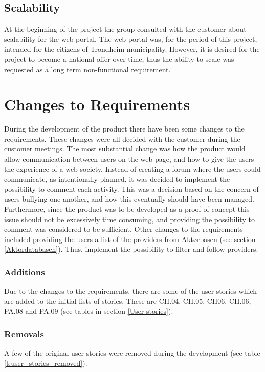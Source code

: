 \subsection{Scalability}
At the beginning of the project the group consulted with the customer about scalability for the web portal. The web portal was, for the period of this project, intended for the citizens of Trondheim municipality. However, it is desired for the project to become a national offer over time, thus the ability to scale was requested as a long term non-functional requirement.


\section{Changes to Requirements}
During the development of the product there have been some changes to the requirements. These changes were all decided with the customer during the customer meetings. The most substantial change was how the product would allow communication between users on the web page, and how to give the users the experience of a web society. Instead of creating a forum where the users could communicate, as intentionally planned, it was decided to implement the possibility to comment each activity. This was a decision based on the concern of users bullying one another, and how this eventually should have been managed. Furthermore, since the product was to be developed as a proof of concept this issue should not be excessively time consuming, and providing the possibility to comment was considered to be sufficient. Other changes to the requirements included providing the users a list of the providers from Aktørbasen (see section \ref{Aktordatabasen}). Thus, implement the possibility to filter and follow providers.

\subsubsection{Additions}
\label{additions}
Due to the changes to the requirements, there are some of the user stories which are added to the initial lists of stories. These are CH.04, CH.05, CH06, CH.06, PA.08 and PA.09 (see tables in section \ref{User stories}).

\subsubsection{Removals}
\label{removals}
A few of the original user stories were removed during the development (see table \ref{t:user_stories_removed}).

